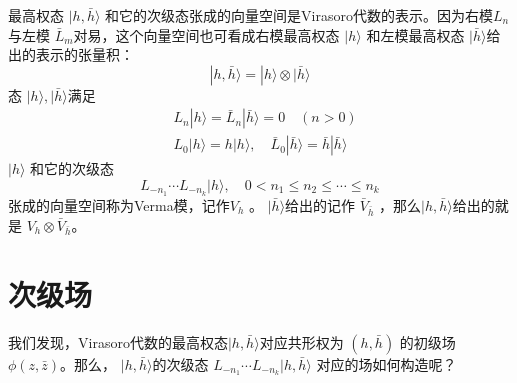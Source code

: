 最高权态 $|h,\bar{h}\rangle$ 和它的次级态张成的向量空间是Virasoro代数的表示。因为右模$ L_n $与左模 $\bar{L}_m$对易，这个向量空间也可看成右模最高权态 $|h\rangle$ 和左模最高权态 $|\bar{h}\rangle $给出的表示的张量积：
\begin{equation}
	|h, \bar{h}\rangle=|h\rangle \otimes|\bar{h}\rangle
\end{equation}
态 $|h\rangle,|\bar{h}\rangle $满足
\begin{equation}
	\begin{aligned} &L_{n}|h\rangle=\bar{L}_{n}|\bar{h}\rangle=0 \quad(n>0) \\& L_{0}|h\rangle=h|h\rangle, \quad \bar{L}_{0}|\bar{h}\rangle=\bar{h}|\bar{h}\rangle \end{aligned}
\end{equation}
$|h\rangle$ 和它的次级态
\begin{equation}
	L_{-n_{1}} \cdots L_{-n_{k}}|h\rangle, \quad 0<n_{1} \leq n_{2} \leq \cdots \leq n_{k}
\end{equation}
张成的向量空间称为Verma模，记作$ V_h$ 。 $|\bar{h}\rangle $给出的记作 $\bar{V}_{\bar{h}}$ ，那么$ |h,\bar{h}\rangle $给出的就是 $V_{h} \otimes \bar{V}_{\bar{h}} $。

\section{次级场}

我们发现，Virasoro代数的最高权态$ |h,\bar{h}\rangle $对应共形权为 $(h,\bar{h})$ 的初级场 $\phi(z,\bar{z}) $。那么， $|h,\bar{h}\rangle $的次级态 $L_{-n_{1}} \cdots L_{-n_{k}}|h, \bar{h}\rangle$ 对应的场如何构造呢？

